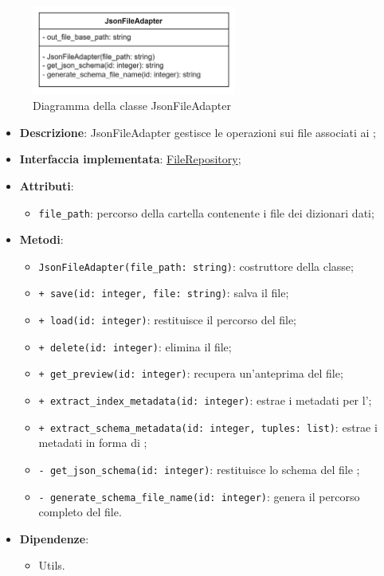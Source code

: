  \label{JsonFileAdapter}
\begin{figure}[H]
    \centering
    \includegraphics[width=0.6\textwidth]{assets/Backend/json_file_adapter.png}
    \caption{Diagramma della classe JsonFileAdapter}
  \end{figure}
\begin{itemize}
    \item \textbf{Descrizione}: JsonFileAdapter gestisce le operazioni  sui file associati ai ;
    \item \textbf{Interfaccia implementata}: \hyperref[FileRepository]{FileRepository};
    \item \textbf{Attributi}:
    \begin{itemize}
        \item \texttt{file\_path}: percorso della cartella contenente i file dei dizionari dati;
    \end{itemize}
    \item \textbf{Metodi}:
    \begin{itemize}
        \item \texttt{JsonFileAdapter(file\_path: string)}: costruttore della classe;
        \item \texttt{+ save(id: integer, file: string)}: salva il file;
        \item \texttt{+ load(id: integer)}: restituisce il percorso del file;
        \item \texttt{+ delete(id: integer)}: elimina il file;
        \item \texttt{+ get\_preview(id: integer)}: recupera un'anteprima del file;
        \item \texttt{+ extract\_index\_metadata(id: integer)}: estrae i metadati per l';
        \item \texttt{+ extract\_schema\_metadata(id: integer, tuples: list)}: estrae i metadati in forma di ;
        \item \texttt{- get\_json\_schema(id: integer)}: restituisce lo schema del file ;
        \item \texttt{- generate\_schema\_file\_name(id: integer)}: genera il percorso completo del file.
    \end{itemize}
    \item \textbf{Dipendenze}:
    \begin{itemize}
        \item Utils.
    \end{itemize}
\end{itemize} 